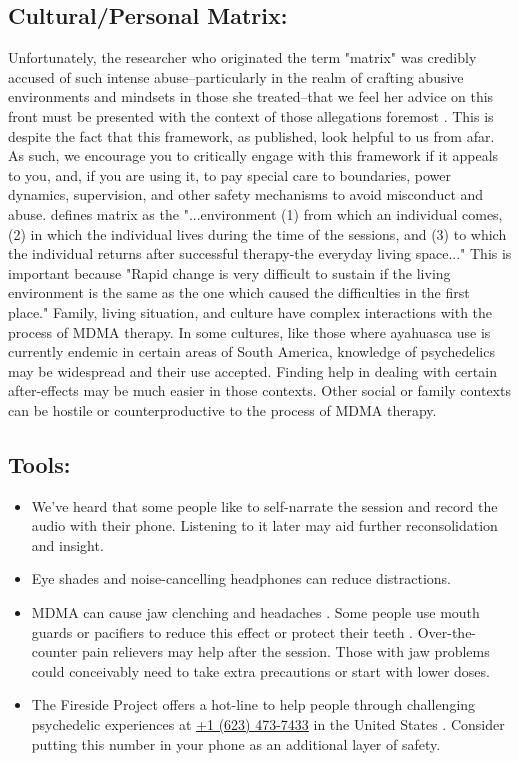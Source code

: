 \documentclass[12pt,letterpaper]{book}
\begin{document}
\subsection{Cultural/Personal Matrix:}
Unfortunately, the researcher who originated the term "matrix" was credibly accused of such intense abuse–particularly in the realm of crafting abusive environments and mindsets in those she treated–that we feel her advice on this front must be presented with the context of those allegations foremost \cite{eisnerAbuse}. This is despite the fact that this framework, as published, look helpful to us from afar. As such, we encourage you to critically engage with this framework if it appeals to you, and, if you are using it, to pay special care to boundaries, power dynamics, supervision, and other safety mechanisms to avoid misconduct and abuse. \textcite{setSettingMatrix} defines matrix as the "...environment (1) from which an individual comes, (2) in which the individual lives during the time of the sessions, and (3) to which the individual returns after successful therapy-the everyday living space..." This is important because "Rapid change is very difficult to sustain if the living environment is the same as the one which caused the difficulties in the first place." Family, living situation, and culture have complex interactions with the process of MDMA therapy. In some cultures, like those where ayahuasca use is currently endemic in certain areas of South America, knowledge of psychedelics may be widespread and their use accepted. Finding help in dealing with certain after-effects may be much easier in those contexts. Other social or family contexts can be hostile or counterproductive to the process of MDMA therapy. 

\subsection*{Tools:}
\begin{itemize}
    \item We've heard that some people like to self-narrate the session and record the audio with their phone. Listening to it later may aid further reconsolidation and insight.
    \item Eye shades and noise-cancelling headphones can reduce distractions.
    \item MDMA can cause jaw clenching and headaches \cite{mitchellMDMAClinicalTrial2,liechtiGender}. Some people use mouth guards or pacifiers to reduce this effect or protect their teeth \cite{emdeEmergency}. Over-the-counter pain relievers may help after the session. Those with jaw problems could conceivably need to take extra precautions or start with lower doses.
    \item The Fireside Project offers a hot-line to help people through challenging psychedelic experiences at \href{tel:1-623-473-7433}{+1 (623) 473-7433} in the United States \cite{firesideProject}. Consider putting this number in your phone as an additional layer of safety.
\end{itemize}
\end{document}

